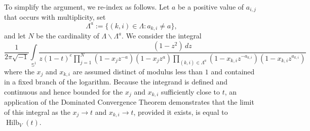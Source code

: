 \documentclass{amsart}
\theoremstyle{definition}
\theoremstyle{remark}
\newcommand{\Sp}{\mathbb{S}}
\newcommand{\Hilb}{\operatorname{Hilb}}
\begin{document}
To simplify the argument, we re-index as follows. Let $a$ be a positive value of $a_{i,j}$ that occurs with
multiplicity, set
\[
    \Lambda^a:= \{ (k,i)\in \Lambda : a_{k,i} \neq a \},
\]
and let $N$ be the cardinality of $\Lambda\smallsetminus\Lambda^a$. We consider the integral
\[
    \frac{1}{2\pi\sqrt{-1}}\int\limits_{\Sp^1}
        \frac{ (1 - z^2) \, dz}
        {z (1 - t)^e\prod\limits_{j=1}^N
                (1 - x_j z^{-a})(1 - x_j z^{a})
            \prod\limits_{(k,i)\in\Lambda^a}
                (1 - x_{k,i} z^{-a_{k,i}})(1 - x_{k,i} z^{a_{k,i}})}
\]
where the $x_j$ and $x_{k,i}$ are assumed distinct of modulus less than $1$ and contained in a fixed branch of
the logarithm. Because the integrand is defined and continuous and hence bounded for the $x_j$ and $x_{k,i}$
sufficiently close to $t$, an application of the Dominated Convergence Theorem demonstrates that the limit of
this integral as the $x_j \to t$ and $x_{k,i}\to t$, provided it exists, is equal to $\Hilb_V(t)$.
\end{document}
